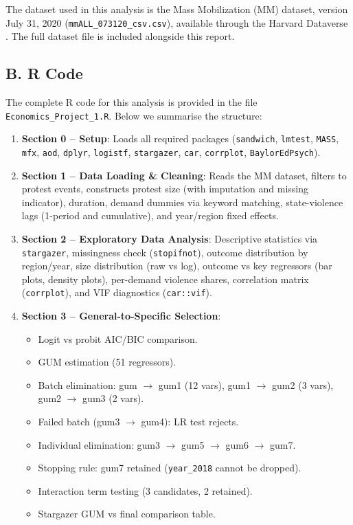 \documentclass[12pt,a4paper]{article}
\begin{document}
The dataset used in this analysis is the Mass Mobilization (MM) dataset, version July 31, 2020 (\texttt{mmALL\_073120\_csv.csv}), available through the Harvard Dataverse \citep{clark2020mass}. The full dataset file is included alongside this report.

\subsection*{B. R Code}

The complete R code for this analysis is provided in the file \texttt{Economics\_Project\_1.R}. Below we summarise the structure:

\begin{enumerate}
  \item \textbf{Section 0 -- Setup}: Loads all required packages (\texttt{sandwich}, \texttt{lmtest}, \texttt{MASS}, \texttt{mfx}, \texttt{aod}, \texttt{dplyr}, \texttt{logistf}, \texttt{stargazer}, \texttt{car}, \texttt{corrplot}, \texttt{BaylorEdPsych}).

  \item \textbf{Section 1 -- Data Loading \& Cleaning}: Reads the MM dataset, filters to protest events, constructs protest size (with imputation and missing indicator), duration, demand dummies via keyword matching, state-violence lags (1-period and cumulative), and year/region fixed effects.

  \item \textbf{Section 2 -- Exploratory Data Analysis}: Descriptive statistics via \texttt{stargazer}, missingness check (\texttt{stopifnot}), outcome distribution by region/year, size distribution (raw vs log), outcome vs key regressors (bar plots, density plots), per-demand violence shares, correlation matrix (\texttt{corrplot}), and VIF diagnostics (\texttt{car::vif}).

  \item \textbf{Section 3 -- General-to-Specific Selection}:
  \begin{itemize}
    \item Logit vs probit AIC/BIC comparison.
    \item GUM estimation (51 regressors).
    \item Batch elimination: gum $\to$ gum1 (12 vars), gum1 $\to$ gum2 (3 vars), gum2 $\to$ gum3 (2 vars).
    \item Failed batch (gum3 $\to$ gum4): LR test rejects.
    \item Individual elimination: gum3 $\to$ gum5 $\to$ gum6 $\to$ gum7.
    \item Stopping rule: gum7 retained (\texttt{year\_2018} cannot be dropped).
    \item Interaction term testing (3 candidates, 2 retained).
    \item Stargazer GUM vs final comparison table.
  \end{itemize}


\end{enumerate}
\end{document}
